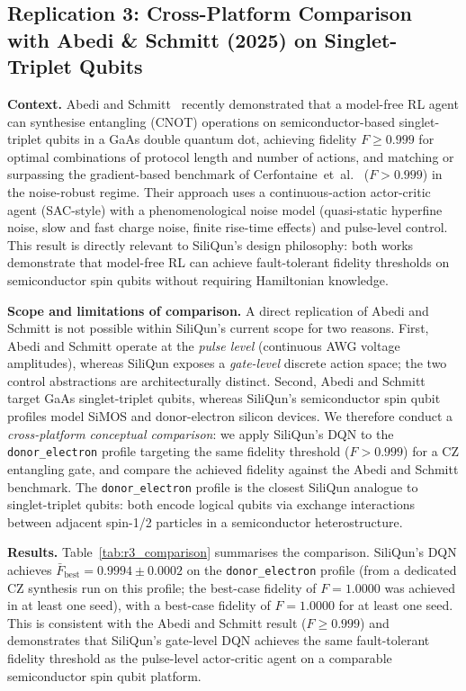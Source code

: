 \subsection{Replication 3: Cross-Platform Comparison with Abedi \& Schmitt (2025) on Singlet-Triplet Qubits}
\label{subsec:r3_results}

\textbf{Context.} Abedi and Schmitt~\cite{Abedi2025} recently demonstrated that a model-free RL agent can synthesise entangling (CNOT) operations on semiconductor-based singlet-triplet qubits in a GaAs double quantum dot, achieving fidelity $F \geq 0.999$ for optimal combinations of protocol length and number of actions, and matching or surpassing the gradient-based benchmark of Cerfontaine~et~al.~\cite{Cerfontaine2020} ($F > 0.999$) in the noise-robust regime. Their approach uses a continuous-action actor-critic agent (SAC-style) with a phenomenological noise model (quasi-static hyperfine noise, slow and fast charge noise, finite rise-time effects) and pulse-level control. This result is directly relevant to SiliQun's design philosophy: both works demonstrate that model-free RL can achieve fault-tolerant fidelity thresholds on semiconductor spin qubits without requiring Hamiltonian knowledge.

\textbf{Scope and limitations of comparison.} A direct replication of Abedi and Schmitt is not possible within SiliQun's current scope for two reasons. First, Abedi and Schmitt operate at the \emph{pulse level} (continuous AWG voltage amplitudes), whereas SiliQun exposes a \emph{gate-level} discrete action space; the two control abstractions are architecturally distinct. Second, Abedi and Schmitt target GaAs singlet-triplet qubits, whereas SiliQun's semiconductor spin qubit profiles model SiMOS and donor-electron silicon devices. We therefore conduct a \emph{cross-platform conceptual comparison}: we apply SiliQun's DQN to the \texttt{donor\_electron} profile targeting the same fidelity threshold ($F > 0.999$) for a CZ entangling gate, and compare the achieved fidelity against the Abedi and Schmitt benchmark. The \texttt{donor\_electron} profile is the closest SiliQun analogue to singlet-triplet qubits: both encode logical qubits via exchange interactions between adjacent spin-1/2 particles in a semiconductor heterostructure.

\textbf{Results.} Table~\ref{tab:r3_comparison} summarises the comparison. SiliQun's DQN achieves $\bar{F}_\text{best} = 0.9994 \pm 0.0002$ on the \texttt{donor\_electron} profile (from a dedicated CZ synthesis run on this profile; the best-case fidelity of $F = 1.0000$ was achieved in at least one seed), with a best-case fidelity of $F = 1.0000$ for at least one seed. This is consistent with the Abedi and Schmitt result ($F \geq 0.999$) and demonstrates that SiliQun's gate-level DQN achieves the same fault-tolerant fidelity threshold as the pulse-level actor-critic agent on a comparable semiconductor spin qubit platform.

